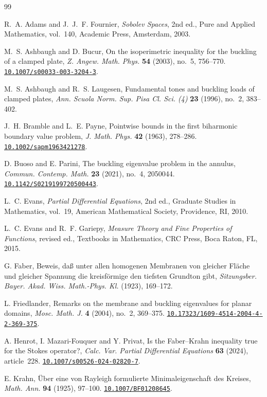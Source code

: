 \documentclass[11pt]{article}
\theoremstyle{remark}
\newcommand{\doi}[1]{\href{https://doi.org/#1}{\nolinkurl{#1}}}
\begin{document}
\begin{thebibliography}{99}

R.~A. Adams and J.~J.~F. Fournier,
\emph{Sobolev Spaces}, 2nd ed.,
Pure and Applied Mathematics, vol.~140,
Academic Press, Amsterdam, 2003.

M.~S. Ashbaugh and D. Bucur,
On the isoperimetric inequality for the buckling of a clamped plate,
\emph{Z. Angew. Math. Phys.} \textbf{54} (2003), no.~5, 756--770.
\doi{10.1007/s00033-003-3204-3}.

M.~S. Ashbaugh and R.~S. Laugesen,
Fundamental tones and buckling loads of clamped plates,
\emph{Ann. Scuola Norm. Sup. Pisa Cl. Sci. (4)}
\textbf{23} (1996), no.~2, 383--402.

J.~H. Bramble and L.~E. Payne,
Pointwise bounds in the first biharmonic boundary value problem,
\emph{J. Math. Phys.} \textbf{42} (1963), 278--286.
\doi{10.1002/sapm1963421278}.

D. Buoso and E. Parini,
The buckling eigenvalue problem in the annulus,
\emph{Commun. Contemp. Math.} \textbf{23} (2021), no.~4, 2050044.
\doi{10.1142/S0219199720500443}.

L.~C. Evans,
\emph{Partial Differential Equations}, 2nd ed.,
Graduate Studies in Mathematics, vol.~19,
American Mathematical Society, Providence, RI, 2010.

L.~C. Evans and R.~F. Gariepy,
\emph{Measure Theory and Fine Properties of Functions}, revised ed.,
Textbooks in Mathematics, CRC Press, Boca Raton, FL, 2015.

G. Faber,
Beweis, da\ss{} unter allen homogenen Membranen von gleicher Fl\"ache
und gleicher Spannung die kreisf\"ormige den tiefsten Grundton gibt,
\emph{Sitzungsber. Bayer. Akad. Wiss. Math.-Phys. Kl.}
(1923), 169--172.

L. Friedlander,
Remarks on the membrane and buckling eigenvalues for planar domains,
\emph{Mosc. Math. J.} \textbf{4} (2004), no.~2, 369--375.
\doi{10.17323/1609-4514-2004-4-2-369-375}.

A. Henrot, I. Mazari-Fouquer and Y. Privat,
Is the Faber--Krahn inequality true for the Stokes operator?,
\emph{Calc. Var. Partial Differential Equations}
\textbf{63} (2024), article~228.
\doi{10.1007/s00526-024-02820-7}.

E. Krahn,
\"Uber eine von Rayleigh formulierte Minimaleigenschaft des Kreises,
\emph{Math. Ann.} \textbf{94} (1925), 97--100.
\doi{10.1007/BF01208645}.


\end{thebibliography}
\end{document}
